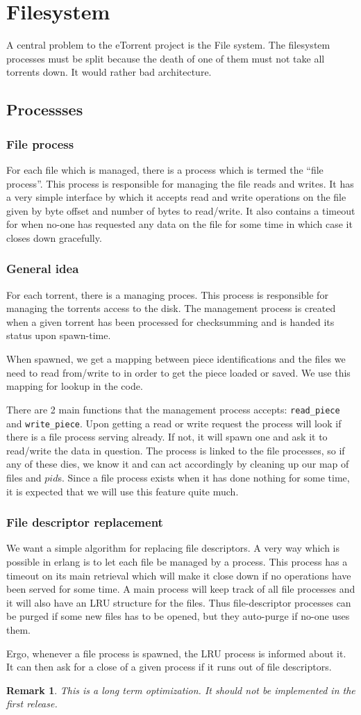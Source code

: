 \documentclass[a4paper]{memoir}
\newtheorem{remark}{Remark}
\begin{document}
\section{Filesystem}
A central problem to the eTorrent project is the File system. The
filesystem processes must be split because the death of one of them
must not take all torrents down. It would rather bad architecture.

\subsection{Processses}
\subsubsection{File process}
For each file which is managed, there is a process which is termed the
``file process''. This process is responsible for managing the file
reads and writes. It has a very simple interface by which it accepts
read and write operations on the file given by byte offset and number
of bytes to read/write. It also contains a timeout for when no-one has
requested any data on the file for some time in which case it closes
down gracefully.

\subsubsection{General idea}
For each torrent, there is a managing proces. This process is
responsible for managing the torrents access to the disk. The
management process is created when a given torrent has been processed
for checksumming and is handed its status upon spawn-time.

When spawned, we get a mapping between piece identifications and the
files we need to read from/write to in order to get the piece loaded
or saved. We use this mapping for lookup in the code.

There are 2 main functions that the management process accepts:
\texttt{read\_piece} and \texttt{write\_piece}. Upon getting a read or
write request the process will look if there is a file process serving
already. If not, it will spawn one and ask it to read/write the data
in question. The process is linked to the file processes, so if any of
these dies, we know it and can act accordingly by cleaning up our map
of files and $pid$s. Since a file process exists when it has done
nothing for some time, it is expected that we will use this feature
quite much.

\subsubsection{File descriptor replacement}
We want a simple algorithm for replacing file descriptors. A very way
which is possible in erlang is to let each file be managed by a
process. This process has a timeout on its main retrieval which will
make it close down if no operations have been served for some time. A
main process will keep track of all file processes and it will also
have an LRU structure for the files. Thus file-descriptor processes can be
purged if some new files has to be opened, but they auto-purge if
no-one uses them.

Ergo, whenever a file process is spawned, the LRU process is informed
about it. It can then ask for a close of a given process if it runs
out of file descriptors.
\begin{remark}
  This is a long term optimization. It should not be implemented in
  the first release.
\end{remark}
\end{document}
